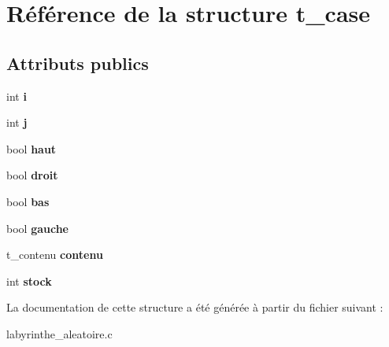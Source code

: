 \hypertarget{structt__case}{\section{Référence de la structure t\+\_\+case}
\label{structt__case}
}
\subsection*{Attributs publics}
\begin{DoxyCompactItemize}
\item 
\hypertarget{structt__case_ac642ecdfc93ec2109d5edf7708052b76}{int {\bfseries i}}\label{structt__case_ac642ecdfc93ec2109d5edf7708052b76}

\item 
\hypertarget{structt__case_a60f7fc08cbadfa2813ec11b9e3ade4b4}{int {\bfseries j}}\label{structt__case_a60f7fc08cbadfa2813ec11b9e3ade4b4}

\item 
\hypertarget{structt__case_a75b66a58cfb0b1a620a378e0d3f51276}{bool {\bfseries haut}}\label{structt__case_a75b66a58cfb0b1a620a378e0d3f51276}

\item 
\hypertarget{structt__case_a5874ae2061829efd670efcd6a938182c}{bool {\bfseries droit}}\label{structt__case_a5874ae2061829efd670efcd6a938182c}

\item 
\hypertarget{structt__case_a36bc5a26c9c4d9b2317fdd5f6c4f2d27}{bool {\bfseries bas}}\label{structt__case_a36bc5a26c9c4d9b2317fdd5f6c4f2d27}

\item 
\hypertarget{structt__case_ab1ae25f6aff0dc8137ab8fb5fd3fd70d}{bool {\bfseries gauche}}\label{structt__case_ab1ae25f6aff0dc8137ab8fb5fd3fd70d}

\item 
\hypertarget{structt__case_aaaa2ae72916f18bf08ec01fba3da8e2e}{t\+\_\+contenu {\bfseries contenu}}\label{structt__case_aaaa2ae72916f18bf08ec01fba3da8e2e}

\item 
\hypertarget{structt__case_a02051ccfc6b97cd6bf5ca633754f3732}{int {\bfseries stock}}\label{structt__case_a02051ccfc6b97cd6bf5ca633754f3732}

\end{DoxyCompactItemize}


La documentation de cette structure a été générée à partir du fichier suivant \+:\begin{DoxyCompactItemize}
\item 
labyrinthe\+\_\+aleatoire.\+c\end{DoxyCompactItemize}
